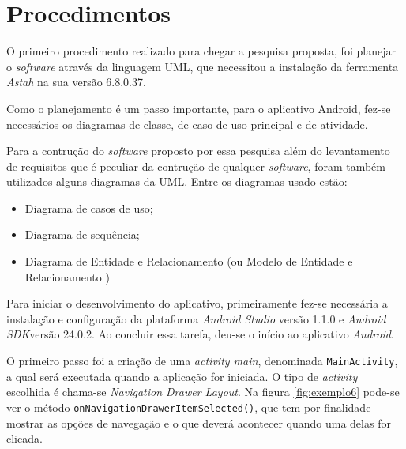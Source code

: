 \section{Procedimentos}
	
	\par O primeiro procedimento realizado para chegar a pesquisa proposta, foi
planejar o \textit{software} através da linguagem UML, que necessitou a
instalação da ferramenta \textit{Astah} na sua versão 6.8.0.37.

	\par Como o planejamento é um passo importante, para o aplicativo Android,
fez-se necessários os diagramas de classe, de caso de uso principal e de
atividade.
	
	\par Para a contrução do \textit{software} proposto por essa pesquisa além do
levantamento de requisitos que é peculiar da contrução de qualquer
\textit{software}, foram também utilizados alguns diagramas da UML. Entre os
diagramas usado estão:

	\begin{itemize}
	  \item Diagrama de casos de uso; 
	  \item Diagrama de sequência;
	  \item Diagrama de Entidade e Relacionamento (ou Modelo de Entidade e
	  Relacionamento )	
	\end{itemize}
	
	
	\par Para iniciar o desenvolvimento do aplicativo, primeiramente fez-se
necessária a instalação e configuração da plataforma \textit{Android Studio}
versão 1.1.0 e \textit{Android SDK}versão 24.0.2. Ao concluir essa tarefa,
deu-se o início ao aplicativo \textit{Android}.

	\par O primeiro passo foi a criação de uma \textit{activity main}, denominada
\texttt{MainActivity}, a qual será executada  quando a aplicação  for iniciada.
O tipo de \textit{activity} escolhida é chama-se \textit{Navigation Drawer
Layout}. Na figura \ref{fig:exemplo6} pode-se ver o método
\texttt{onNavigationDrawerItemSelected()}, que tem por finalidade mostrar as
opções de navegação e o que deverá acontecer quando uma delas for clicada. 
	
